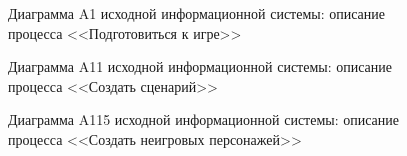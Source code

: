 \begin{figure}[h]
\caption{Диаграмма A1 исходной информационной системы: описание процесса <<Подготовиться к игре>>}
\label{ris:current_a1_diagram}
\end{figure}

\begin{figure}[h]
\caption{Диаграмма A11 исходной информационной системы: описание процесса <<Создать сценарий>>}
\label{ris:current_a11_diagram}
\end{figure}

\begin{figure}[h]
\caption{Диаграмма A115 исходной информационной системы: описание процесса <<Создать неигровых персонажей>>}
\label{ris:current_a115_diagram}
\end{figure}

